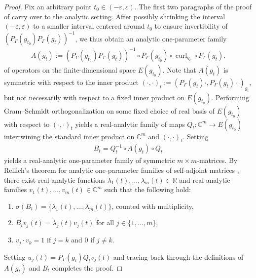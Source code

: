 \documentclass[11pt,reqno]{amsart}
\DeclareMathOperator{\curl}{curl}
\begin{document}
\begin{proof}
    Fix an arbitrary point $t_0 \in (-\varepsilon,\varepsilon)$. The first two paragraphs of the proof of  carry over to the analytic setting. After possibly shrinking the interval $(-\varepsilon,\varepsilon)$ to a smaller interval centered around $t_0$ to ensure invertibility of $\left(P_\Gamma(g_{t_0}) P_\Gamma(g_t) \right)^{-1}$, we thus obtain an analytic one-parameter family
    \begin{align*}
        A(g_t) := \left( P_\Gamma(g_{t_0}) P_\Gamma(g_t) \right)^{-1} \circ P_\Gamma(g_{t_0}) \circ \curl_{g_t} \circ P_\Gamma(g_t).
    \end{align*}
    of operators on the finite-dimensional space $E(g_{t_0})$. Note that $A(g_t)$ is symmetric with respect to the inner product $\left( \cdot, \cdot \right)_{t} := \left( P_\Gamma(g_t) \cdot, P_\Gamma(g_t) \cdot \right)_{g_t}$, but not necessarily with respect to a fixed inner product on $E(g_{t_0})$. Performing Gram--Schmidt orthogonalization on some fixed choice of real basis of $E(g_{t_0})$ with respect to $\left( \cdot, \cdot \right)_{t}$ yields a real-analytic family of maps $Q_t : \mathbb C^{m} \to E(g_{t_0})$ intertwining the standard inner product on $\mathbb C^m$ and $\left( \cdot, \cdot \right)_{t}$. Setting
    \begin{align*}
        B_t = Q_t^{-1} \circ A(g_t) \circ Q_t
    \end{align*}
    yields a real-analytic one-parameter family of symmetric $m\times m$-matrices. By Rellich's theorem for analytic one-parameter families of self-adjoint matrices \cite[Theorem 2]{RellichI}, there exist real-analytic functions $\lambda_1(t),\ldots,\lambda_m(t) \in \mathbb R$ and real-analytic families $v_1(t),\ldots,v_m(t) \in \mathbb C^m$ such that the following hold:
    \begin{enumerate}[label=(\arabic*)]
        \item $\sigma(B_t) = \{\lambda_1(t),\ldots,\lambda_m(t)\}$, counted with multiplicity,
        \item $B_t v_j(t) = \lambda_j(t) v_j(t)$ for all $j \in \{1,\ldots,m\}$,
        \item $v_j \cdot v_k = 1$ if $j = k$ and $0$ if $j \neq k$.
    \end{enumerate}
    Setting $u_j(t) = P_\Gamma(g_t) Q_t v_j(t)$ and tracing back through the definitions of $A(g_t)$ and $B_t$ completes the proof.
\end{proof}
\end{document}
